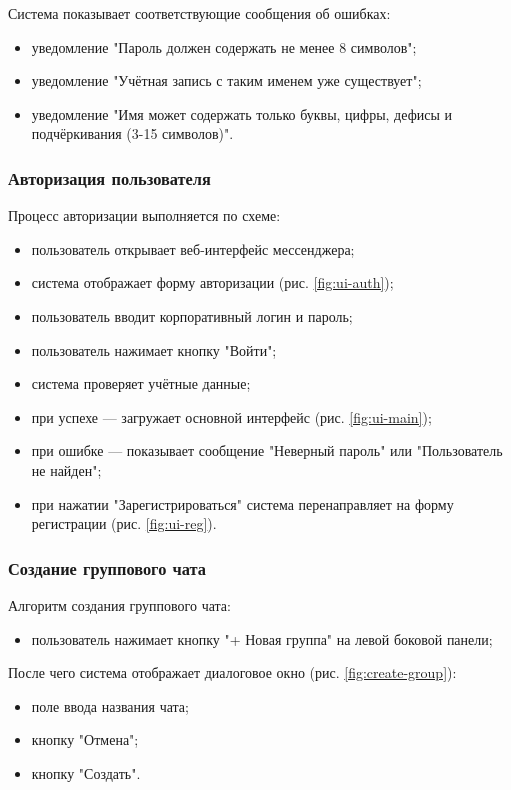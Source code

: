 Система показывает соответствующие сообщения об ошибках:  

\begin{itemize}
	\item уведомление "Пароль должен содержать не менее 8 символов";    
	\item уведомление "Учётная запись с таким именем уже существует";
	\item уведомление "Имя может содержать только буквы, цифры, дефисы и подчёркивания (3-15 символов)".
\end{itemize}

\subsubsection{Авторизация пользователя}  
Процесс авторизации выполняется по схеме:  
\begin{itemize}  
	\item пользователь открывает веб-интерфейс мессенджера;  
	\item система отображает форму авторизации (рис. \ref{fig:ui-auth});  
	\item пользователь вводит корпоративный логин и пароль;  
	\item пользователь нажимает кнопку "Войти";  
	\item система проверяет учётные данные;
	\item при успехе — загружает основной интерфейс (рис. \ref{fig:ui-main});  
	\item при ошибке — показывает сообщение "Неверный пароль" или "Пользователь не найден";   
	\item при нажатии "Зарегистрироваться" система перенаправляет на форму регистрации (рис. \ref{fig:ui-reg}).  
\end{itemize}  

\subsubsection{Создание группового чата}  
Алгоритм создания группового чата:  
\begin{itemize}  
	\item пользователь нажимает кнопку "+ Новая группа" на левой боковой панели;
\end{itemize}

После чего система отображает диалоговое окно (рис. \ref{fig:create-group}): 

\begin{itemize}
	\item поле ввода названия чата;
	\item кнопку "Отмена";
	\item кнопку "Создать".
\end{itemize}


